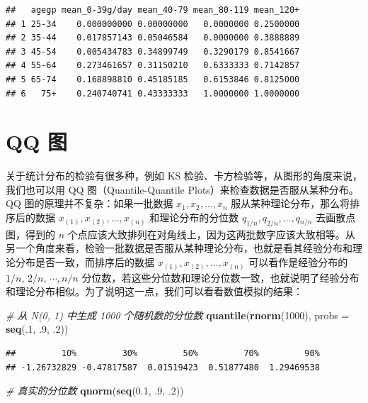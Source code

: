 \documentclass[
  b5paper,
  UTF8,twoside]{book}
\newenvironment{Shaded}{\begin{snugshade}}{\end{snugshade}}
\newcommand{\AttributeTok}[1]{\textcolor[rgb]{0.13,0.29,0.53}{#1}}
\newcommand{\CommentTok}[1]{\textcolor[rgb]{0.56,0.35,0.01}{\textit{#1}}}
\newcommand{\DecValTok}[1]{\textcolor[rgb]{0.00,0.00,0.81}{#1}}
\newcommand{\FloatTok}[1]{\textcolor[rgb]{0.00,0.00,0.81}{#1}}
\newcommand{\FunctionTok}[1]{\textcolor[rgb]{0.13,0.29,0.53}{\textbf{#1}}}
\newcommand{\NormalTok}[1]{#1}
\begin{document}
\begin{verbatim}
##   agegp mean_0-39g/day mean_40-79 mean_80-119 mean_120+
## 1 25-34    0.000000000 0.00000000   0.0000000 0.2500000
## 2 35-44    0.017857143 0.05046584   0.0000000 0.3888889
## 3 45-54    0.005434783 0.34899749   0.3290179 0.8541667
## 4 55-64    0.273461657 0.31150210   0.6333333 0.7142857
## 5 65-74    0.168898810 0.45185185   0.6153846 0.8125000
## 6   75+    0.240740741 0.43333333   1.0000000 1.0000000
\end{verbatim}

\section{QQ 图}\label{sec:qqplot}

关于统计分布的检验有很多种，例如 KS 检验、卡方检验等，从图形的角度来说，我们也可以用 QQ 图（Quantile-Quantile
Plots）来检查数据是否服从某种分布。QQ 图的原理并不复杂：如果一批数据 \(x_{1},x_{2},\ldots,x_{n}\) 服从某种理论分布，那么将排序后的数据 \(x_{(1)},x_{(2)},\ldots,x_{(n)}\) 和理论分布的分位数 \(q_{1/n},q_{2/n},\ldots,q{}_{n/n}\) 去画散点图，得到的 \(n\) 个点应该大致排列在对角线上，因为这两批数字应该大致相等。从另一个角度来看，检验一批数据是否服从某种理论分布，也就是看其经验分布和理论分布是否一致，而排序后的数据 \(x_{(1)},x_{(2)},\ldots,x_{(n)}\) 可以看作是经验分布的 \(1/n,\,2/n,\,\cdots,n/n\) 分位数，若这些分位数和理论分位数一致，也就说明了经验分布和理论分布相似。为了说明这一点，我们可以看看数值模拟的结果：

\begin{Shaded}
\begin{Highlighting}[]
\CommentTok{\# 从 N(0, 1) 中生成 1000 个随机数的分位数}
\FunctionTok{quantile}\NormalTok{(}\FunctionTok{rnorm}\NormalTok{(}\DecValTok{1000}\NormalTok{), }\AttributeTok{probs =} \FunctionTok{seq}\NormalTok{(.}\DecValTok{1}\NormalTok{, .}\DecValTok{9}\NormalTok{, .}\DecValTok{2}\NormalTok{))}
\end{Highlighting}
\end{Shaded}

\begin{verbatim}
##         10%         30%         50%         70%         90% 
## -1.26732829 -0.47817587  0.01519423  0.51877480  1.29469538
\end{verbatim}

\begin{Shaded}
\begin{Highlighting}[]
\CommentTok{\# 真实的分位数}
\FunctionTok{qnorm}\NormalTok{(}\FunctionTok{seq}\NormalTok{(}\FloatTok{0.1}\NormalTok{, .}\DecValTok{9}\NormalTok{, .}\DecValTok{2}\NormalTok{))}
\end{Highlighting}
\end{Shaded}
\end{document}

